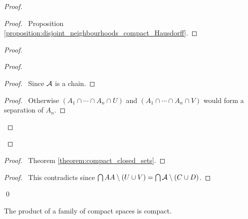 \begin{proof}
    \pf
    \begin{proof}
        \pf\ Proposition \ref{proposition:disjoint_neighbourhoods_compact_Hausdorff}.
    \end{proof}
    \begin{proof}
        \begin{proof}
            \pf
            \begin{proof}
                \pf\ Since $\AA$ is a chain.
            \end{proof}
            \begin{proof}
                \pf\ Otherwise $(A_1 \cap \cdots \cap A_n \cap U)$ and $(A_1 \cap \cdots \cap A_n \cap V)$
                would form a separation of $A_n$.
            \end{proof}
        \end{proof}
    \end{proof}
    \begin{proof}
        \pf\ Theorem \ref{theorem:compact_closed_sets}.
    \end{proof}
    \qedstep
    \begin{proof}
        \pf\ This contradicts  since $\bigcap AA \setminus (U \cup V)
        = \bigcap \AA \setminus (C \cup D)$.
    \end{proof}
    \qed
\end{proof}

\begin{theorem}
    The product of a family of compact spaces is compact.
\end{theorem}

